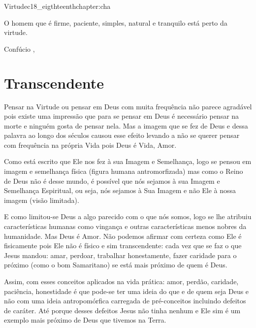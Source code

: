 \begin{chapterpage}{Virtude}{c18_eigthteenthchapter:cha}

\begin{myquotation}O homem que é firme, paciente, simples, natural e tranquilo está perto da virtude.
 
\par\vspace*{15mm}
\mbox{}\hfill \emdash{}Confúcio 
, %
\par\end{myquotation}

\end{chapterpage}



\section{Transcendente}\label{c1_basicformatting:sec}

\emdash{}Pensar na Virtude ou pensar em Deus com muita frequência não parece agradável pois existe uma impressão que para se pensar em Deus é necessário pensar na morte e ninguém gosta de pensar nela. Mas a imagem que se fez de Deus e dessa palavra ao longo dos séculos causou esse efeito levando a não se querer pensar com frequência na própria Vida pois Deus é Vida, Amor.

\emdash{}Como está escrito que Ele nos fez à sua Imagem e Semelhança, logo se pensou em imagem e semelhança física (figura humana antromorfizada) mas como o Reino de Deus não é desse mundo, é possível que nós sejamos à sua Imagem e Semelhança Espiritual, ou seja, nós sejamos à Sua Imagem e não Ele à nossa imagem (visão limitada).

\emdash{}E como limitou-se Deus a algo parecido com o que nós somos, logo se lhe atribuiu características humanas como vingança e outras características menos nobres da humanidade. Mas Deus é Amor. Não podemos afirmar com certeza como Ele é fisicamente pois Ele não é físico e sim transcendente: cada vez que se faz o que Jesus mandou: amar, perdoar, trabalhar honestamente, fazer caridade para o próximo (como o bom Samaritano) se está mais próximo de quem é Deus.

\emdash{}Assim, com esses conceitos aplicados na vida prática: amor, perdão, caridade, paciência, honestidade é que pode-se ter uma ideia do que e de quem seja Deus e não com uma ideia antropomórfica carregada de pré-conceitos incluindo defeitos de caráter. Até porque desses defeitos Jesus não tinha nenhum e Ele sim é um exemplo mais próximo de Deus que tivemos na Terra.

